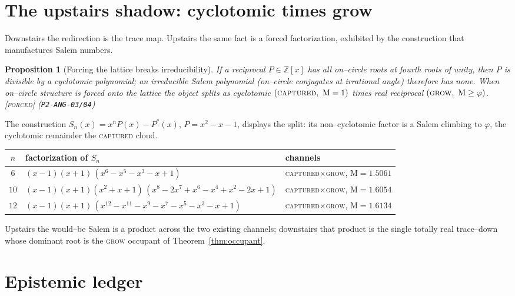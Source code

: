 \documentclass[11pt]{article}
\theoremstyle{plain}
\newtheorem{proposition}[theorem]{Proposition}
\theoremstyle{definition}
\theoremstyle{remark}
\newcommand{\forced}{\textcolor{forcedc}{\textsc{[forced]}}}
\newcommand{\Z}{\mathbb{Z}}
\newcommand{\Mah}{\mathrm{M}}
\begin{document}
\section{The upstairs shadow: cyclotomic times grow}\label{sec:upstairs}

Downstairs the redirection is the trace map. Upstairs the same fact is a forced factorization, exhibited by the construction that manufactures Salem numbers.

\begin{proposition}[Forcing the lattice breaks irreducibility]\label{prop:factor}
If a reciprocal $P\in\Z[x]$ has all on--circle roots at fourth roots of unity, then $P$ is divisible by a cyclotomic polynomial; an irreducible Salem polynomial (on--circle conjugates at irrational angle) therefore has none. When on--circle structure is forced onto the lattice the object splits as cyclotomic $(\textsc{captured},\ \Mah=1)$ times real reciprocal $(\textsc{grow},\ \Mah\ge\varphi)$. \forced{} {\small(\texttt{P2-ANG-03/04})}
\end{proposition}

The construction $S_n(x)=x^nP(x)-P^*(x)$, $P=x^2-x-1$, displays the split: its non--cyclotomic factor is a Salem climbing to $\varphi$, the cyclotomic remainder the \textsc{captured} cloud.
\begin{center}
\renewcommand{\arraystretch}{1.15}
\begin{tabular}{@{}cll@{}}
\toprule
$n$ & factorization of $S_n$ & channels\\
\midrule
$6$ & $(x-1)(x+1)\,(x^6-x^5-x^3-x+1)$ & \textsc{captured}$\times$\textsc{grow}, $\Mah=1.5061$\\
$10$& $(x-1)(x+1)(x^2{+}x{+}1)\,(x^8{-}2x^7{+}x^6{-}x^4{+}x^2{-}2x{+}1)$ & \textsc{captured}$\times$\textsc{grow}, $\Mah=1.6054$\\
$12$& $(x-1)(x+1)\,(x^{12}{-}x^{11}{-}x^9{-}x^7{-}x^5{-}x^3{-}x{+}1)$ & \textsc{captured}$\times$\textsc{grow}, $\Mah=1.6134$\\
\bottomrule
\end{tabular}
\end{center}
Upstairs the would--be Salem is a product across the two existing channels; downstairs that product is the single totally real trace--down whose dominant root is the \textsc{grow} occupant of Theorem~\ref{thm:occupant}.

\section{Epistemic ledger}\label{sec:ledger}
\end{document}
